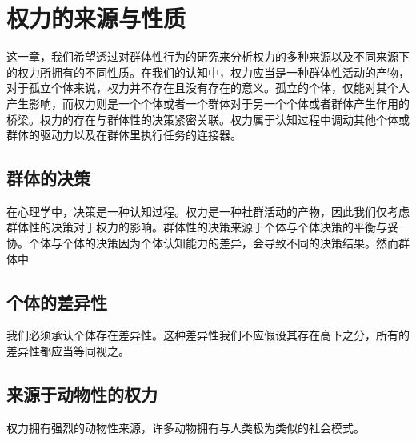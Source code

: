 \documentclass[main.tex]{subfiles}
\begin{document}
\chapter{权力的来源与性质}
这一章，我们希望透过对群体性行为的研究来分析权力的多种来源以及不同来源下的权力所拥有的不同性质。在我们的认知中，权力应当是一种群体性活动的产物，对于孤立个体来说，权力并不存在且没有存在的意义。孤立的个体，仅能对其个人产生影响，而权力则是一个个体或者一个群体对于另一个个体或者群体产生作用的桥梁。权力的存在与群体性的决策紧密关联。权力属于认知过程中调动其他个体或群体的驱动力以及在群体里执行任务的连接器。

\section{群体的决策}
在心理学中，决策是一种认知过程。权力是一种社群活动的产物，因此我们仅考虑群体性的决策对于权力的影响。群体性的决策来源于个体与个体决策的平衡与妥协。个体与个体的决策因为个体认知能力的差异，会导致不同的决策结果。然而群体中

\section{个体的差异性}
我们必须承认个体存在差异性。这种差异性我们不应假设其存在高下之分，所有的差异性都应当等同视之。

\section{来源于动物性的权力}
权力拥有强烈的动物性来源，许多动物拥有与人类极为类似的社会模式。
\end{document}
